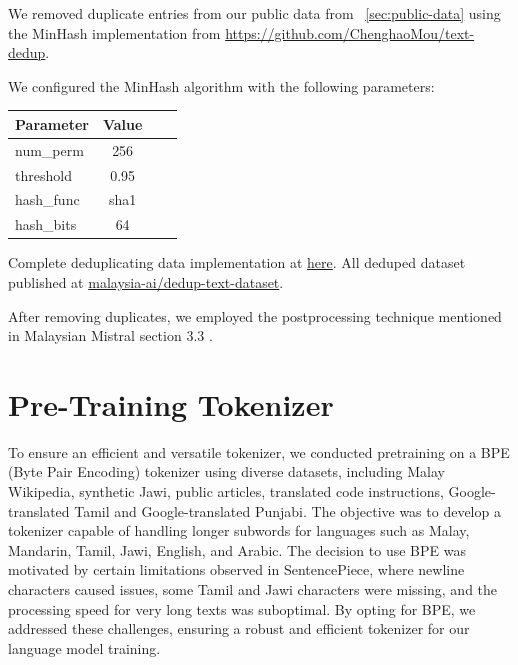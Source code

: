 \documentclass{article}
\begin{document}
We removed duplicate entries from our public data from ~\ref{sec:public-data} using the MinHash implementation from \url{https://github.com/ChenghaoMou/text-dedup}.

We configured the MinHash algorithm with the following parameters:

\begin{table}[h]
  \centering
  \begin{tabular}{lccl}
    \hline
    \textbf{Parameter} & \textbf{Value} \\
    \hline
    num\_perm          & 256            \\
    threshold          & 0.95           \\
    hash\_func         & sha1           \\
    hash\_bits         & 64             \\
    \hline
  \end{tabular}
\end{table}

Complete deduplicating data implementation at \href{https://github.com/malaysia-ai/dedup-text-dataset?tab=readme-ov-file#text-dedup}{here}. All deduped dataset published at \href{https://huggingface.co/datasets/malaysia-ai/dedup-text-dataset}{malaysia-ai/dedup-text-dataset}.

After removing duplicates, we employed the postprocessing technique mentioned in Malaysian Mistral section 3.3 \cite{zolkepli2024large}.

\section{Pre-Training Tokenizer}

To ensure an efficient and versatile tokenizer, we conducted pretraining on a BPE (Byte Pair Encoding) tokenizer using diverse datasets, including Malay Wikipedia, synthetic Jawi, public articles, translated code instructions, Google-translated Tamil and Google-translated Punjabi. The objective was to develop a tokenizer capable of handling longer subwords for languages such as Malay, Mandarin, Tamil, Jawi, English, and Arabic. The decision to use BPE was motivated by certain limitations observed in SentencePiece, where newline characters caused issues, some Tamil and Jawi characters were missing, and the processing speed for very long texts was suboptimal. By opting for BPE, we addressed these challenges, ensuring a robust and efficient tokenizer for our language model training.
\end{document}
